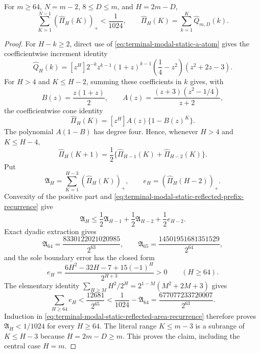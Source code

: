 \begin{lemma}
\label{lem:terminal-modal-static-reflected-prefix}
For $m\ge64$, $N=m-2$, $8\le D\le m$, and $H=2m-D$,
\begin{equation}
 \sum_{K=1}^{N-1}(\widehat\Pi_H(K))_+<\frac1{1024},
 \qquad
 \widehat\Pi_H(K)=\sum_{k=1}^K\widehat Q_{m,D}(k).
 \label{eq:terminal-modal-static-reflected-positive}
\end{equation}
\end{lemma}

\begin{proof}
For $H-k\ge2$, direct use of
\eqref{eq:terminal-modal-static-a-atom} gives the coefficientwise increment
identity
\begin{equation}
 \widehat Q_H(k)=[z^H]2^{-k}z^{k-1}(1+z)^{k-1}
 \left(\frac14-z^2\right)(z^2+2z-3).
 \label{eq:terminal-modal-static-reflected-increment-gf}
\end{equation}
For $H>4$ and $K\le H-2$, summing these coefficients in $k$ gives, with
\[
 B(z)=\frac{z(1+z)}2,
 \qquad
 A(z)=\frac{(z+3)(z^2-1/4)}{z+2},
\]
the coefficientwise cone identity
\begin{equation}
 \widehat\Pi_H(K)=[z^H]A(z)\{1-B(z)^K\}.
 \label{eq:terminal-modal-static-reflected-prefix-closed}
\end{equation}
The polynomial $A(1-B)$ has degree four.  Hence, whenever $H>4$ and
$K\le H-4$,
\begin{equation}
 \widehat\Pi_H(K+1)
 =\frac12\{\widehat\Pi_{H-1}(K)+\widehat\Pi_{H-2}(K)\}.
 \label{eq:terminal-modal-static-reflected-prefix-recurrence}
\end{equation}
Put
\[
 \mathfrak A_H=\sum_{K=1}^{H-3}(\widehat\Pi_H(K))_+,
 \qquad
 e_H=(\widehat\Pi_H(H-2))_+.
\]
Convexity of the positive part and
\eqref{eq:terminal-modal-static-reflected-prefix-recurrence} give
\begin{equation}
 \mathfrak A_H\le
 \frac12\mathfrak A_{H-1}+\frac12\mathfrak A_{H-2}
 +\frac12e_{H-2}.
 \label{eq:terminal-modal-static-reflected-area-recurrence}
\end{equation}
Exact dyadic extraction gives
\begin{equation}
 \mathfrak A_{64}=\frac{8330122021020985}{2^{63}},
 \qquad
 \mathfrak A_{65}=\frac{14501951681351529}{2^{64}},
 \label{eq:terminal-modal-static-reflected-area-bases}
\end{equation}
and the sole boundary error has the closed form
\begin{equation}
 e_H=\frac{6H^2-32H-7+15(-1)^H}{2^{H+3}}>0
 \qquad(H\ge64).
 \label{eq:terminal-modal-static-reflected-boundary}
\end{equation}
The elementary identity
$\sum_{H\ge M}H^2/2^H=2^{1-M}(M^2+2M+3)$ gives
\[
 \sum_{H\ge64}e_H<\frac{12681}{2^{65}}
 <\frac1{1024}-\mathfrak A_{64}
 =\frac{677077233720007}{2^{63}}.
\]
Induction in \eqref{eq:terminal-modal-static-reflected-area-recurrence}
therefore proves $\mathfrak A_H<1/1024$ for every $H\ge64$.
The literal range $K\le m-3$ is a subrange of $K\le H-3$ because
$H=2m-D\ge m$.  This proves the claim, including the central case $H=m$.
\end{proof}

